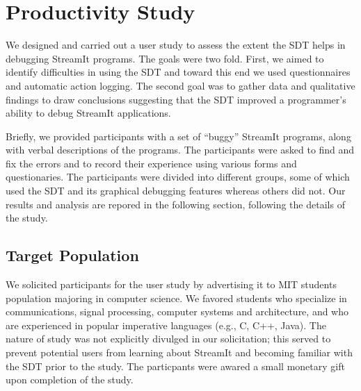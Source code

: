 \documentclass[11pt, letterpaper, onecolumn]{article}
\begin{document}

\section{Productivity Study}

We designed and carried out a  user study to assess the extent the SDT
helps in debugging StreamIt programs.  The goals were two fold. First,
we aimed to identify difficulties in using the SDT and toward this end
we used questionnaires and  automatic action logging.  The second goal
was  to  gather data  and  qualitative  findings  to draw  conclusions
suggesting  that the  SDT  improved a  programmer's  ability to  debug
StreamIt applications.

Briefly,  we provided participants  with a  set of  ``buggy'' StreamIt
programs,  along  with  verbal  descriptions  of  the  programs.   The
participants were asked to find and fix the errors and to record their
experience  using various forms  and questionaries.   The participants
were divided into different groups, some of which used the SDT and its
graphical debugging  features whereas others did not.  Our results and
analysis are  repored in the following section,  following the details
of the study.


\subsection{Target Population}

We solicited participants for the  user study by advertising it to MIT
students population majoring in  computer science. We favored students
who specialize in  communications, signal processing, computer systems
and  architecture,  and  who  are experienced  in  popular  imperative
languages  (e.g.,  C,  C++,  Java).   The  nature  of  study  was  not
explicitly  divulged  in  our  solicitation; this  served  to  prevent
potential  users from  learning about  StreamIt and  becoming familiar
with the SDT  prior to the study. The particpants  were awared a small
monetary gift upon completion of the study.

\end{document}
